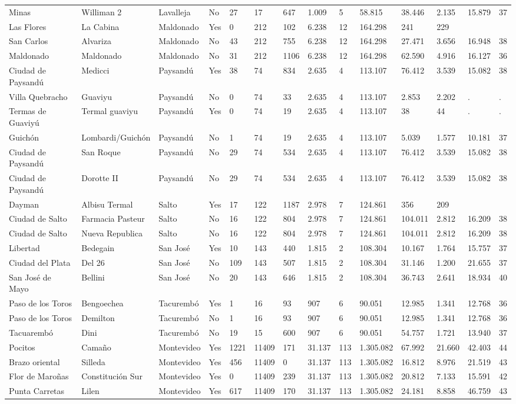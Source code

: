 \documentclass[11pt]{article}
\begin{document}
\begin{landscape}
\begin{longtable}[htbp]{@{}p{1.2cm}p{1cm}p{1.5cm}p{1cm}p{1cm}p{1cm}p{1cm}p{1cm}p{1cm}p{1cm}p{1cm}p{1.2cm}p{1cm}p{1cm}@{}}
Minas	&	Williman 2	&	Lavalleja	&	No	&	27	&	17	&	647	&	1.009	&	5	&	58.815	&	38.446	&	2.135	&	15.879	&	37	\tabularnewline
Las Flores	&	La Cabina	&	Maldonado	&	Yes	&	0	&	212	&	102	&	6.238	&	12	&	164.298	&	241	&	229	&		&		\tabularnewline
San Carlos	&	Alvariza	&	Maldonado	&	No	&	43	&	212	&	755	&	6.238	&	12	&	164.298	&	27.471	&	3.656	&	16.948	&	38	\tabularnewline
Maldonado	&	Maldonado	&	Maldonado	&	No	&	31	&	212	&	1106	&	6.238	&	12	&	164.298	&	62.590	&	4.916	&	16.127	&	36	\tabularnewline
Ciudad de Paysandú	&	Medicci	&	Paysandú	&	Yes	&	38	&	74	&	834	&	2.635	&	4	&	113.107	&	76.412	&	3.539	&	15.082	&	38	\tabularnewline
Villa Quebracho	&	Guaviyu	&	Paysandú	&	No	&	0	&	74	&	33	&	2.635	&	4	&	113.107	&	2.853	&	2.202	&	.	&	.	\tabularnewline
Termas de Guaviyú	&	Termal guaviyu	&	Paysandú	&	Yes	&	0	&	74	&	19	&	2.635	&	4	&	113.107	&	38	&	44	&	.	&	.	\tabularnewline
Guichón	&	Lombardi/Guichón	&	Paysandú	&	No	&	1	&	74	&	19	&	2.635	&	4	&	113.107	&	5.039	&	1.577	&	10.181	&	37	\tabularnewline
Ciudad de Paysandú	&	San Roque	&	Paysandú	&	No	&	29	&	74	&	534	&	2.635	&	4	&	113.107	&	76.412	&	3.539	&	15.082	&	38	\tabularnewline
Ciudad de Paysandú	&	Dorotte II	&	Paysandú	&	No	&	29	&	74	&	534	&	2.635	&	4	&	113.107	&	76.412	&	3.539	&	15.082	&	38	\tabularnewline
Dayman	&	Albisu Termal	&	Salto	&	Yes	&	17	&	122	&	1187	&	2.978	&	7	&	124.861	&	356	&	209	&		&		\tabularnewline
Ciudad de Salto	&	Farmacia Pasteur	&	Salto	&	No	&	16	&	122	&	804	&	2.978	&	7	&	124.861	&	104.011	&	2.812	&	16.209	&	38	\tabularnewline
Ciudad de Salto	&	Nueva Republica	&	Salto	&	No	&	16	&	122	&	804	&	2.978	&	7	&	124.861	&	104.011	&	2.812	&	16.209	&	38	\tabularnewline
Libertad	&	Bedegain	&	San José	&	Yes	&	10	&	143	&	440	&	1.815	&	2	&	108.304	&	10.167	&	1.764	&	15.757	&	37	\tabularnewline
Ciudad del Plata	&	Del 26	&	San José	&	No	&	109	&	143	&	507	&	1.815	&	2	&	108.304	&	31.146	&	1.200	&	21.655	&	37	\tabularnewline
San José de Mayo	&	Bellini	&	San José	&	No	&	20	&	143	&	646	&	1.815	&	2	&	108.304	&	36.743	&	2.641	&	18.934	&	40	\tabularnewline
Paso de los Toros	&	Bengoechea	&	Tacurembó	&	Yes	&	1	&	16	&	93	&	907	&	6	&	90.051	&	12.985	&	1.341	&	12.768	&	36	\tabularnewline
Paso de los Toros	&	Demilton	&	Tacurembó	&	No	&	1	&	16	&	93	&	907	&	6	&	90.051	&	12.985	&	1.341	&	12.768	&	36	\tabularnewline
Tacuarembó	&	Dini	&	Tacurembó	&	No	&	19	&	15	&	600	&	907	&	6	&	90.051	&	54.757	&	1.721	&	13.940	&	37	\tabularnewline
Pocitos	&	Camaño	&	Montevideo	&	Yes	&	1221	&	11409	&	171	&	31.137	&	113	&	1.305.082	&	67.992	&	21.660	&	42.403	&	44	\tabularnewline
Brazo oriental	&	Silleda	&	Montevideo	&	Yes	&	456	&	11409	&	0	&	31.137	&	113	&	1.305.082	&	16.812	&	8.976	&	21.519	&	43	\tabularnewline
Flor de Maroñas	&	Constitución Sur	&	Montevideo	&	Yes	&	0	&	11409	&	239	&	31.137	&	113	&	1.305.082	&	20.812	&	7.133	&	15.591	&	42	\tabularnewline
Punta Carretas	&	Lilen	&	Montevideo	&	Yes	&	617	&	11409	&	170	&	31.137	&	113	&	1.305.082	&	24.181	&	8.858	&	46.759	&	43	\tabularnewline


\end{longtable}
\end{landscape}
\end{document}
